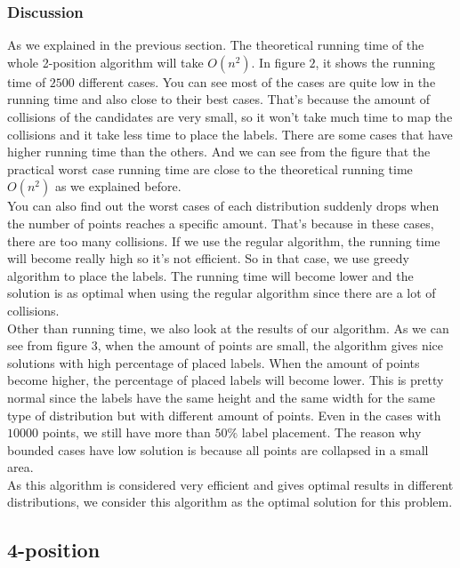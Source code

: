 \documentclass[crop=false,a4paper,oneside,11pt]{standalone}
\begin{document}
\subsubsection{Discussion}
As we explained in the previous section. The theoretical running time of the whole 2-position algorithm will take $O(n^2)$. In figure $2$, it shows the running time of $2500$ different cases. You can see most of the cases are quite low in the running time and also close to their best cases. That's because the amount of collisions of the candidates are very small, so it won't take much time to map the collisions and it take less time to place the labels. There are some cases that have higher running time than the others. And we can see from the figure that the practical worst case running time are close to the theoretical running time $O(n^2)$ as we explained before. \\
You can also find out the worst cases of each distribution suddenly drops when the number of points reaches a specific amount. That's because in these cases, there are too many collisions. If we use the regular algorithm, the running time will become really high so it's not efficient. So in that case, we use greedy algorithm to place the labels. The running time will become lower and the solution is as optimal when using the regular algorithm since there are a lot of collisions.\\
Other than running time, we also look at the results of our algorithm. As we can see from figure $3$, when the amount of points are small, the algorithm gives nice solutions with high percentage of placed labels. When the amount of points become higher, the percentage of placed labels will become lower. This is pretty normal since the labels have the same height and the same width for the same type of distribution but with different amount of points. Even in the cases with $10000$ points, we still have more than $50\%$ label placement. The reason why bounded cases have low solution is because all points are collapsed in a small area.\\
As this algorithm is considered very efficient and gives optimal results in different distributions, we consider this algorithm as the optimal solution for this problem.

\subsection{4-position}
\end{document}
